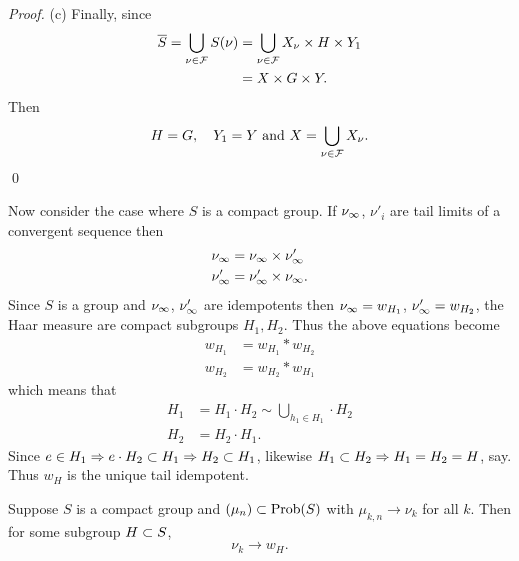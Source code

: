 \begin{proof}
     (c) Finally, since
\[
\begin{aligned}
       \overline S = \bigcup_{\nu\in\mathcal{F}} S(\nu)
          &= \bigcup_{\nu\in\mathcal{F}} X_\nu \times H \times Y_1  \\
     &= X \times G \times Y.
\end{aligned}
\]
Then
\[
     H = G, \quad Y_1 = Y \hbox{ and } X = \bigcup_{\nu\in\mathcal{F}} X_\nu.
\]
\qed
\end{proof}

Now consider the case where $S$ is a compact group.  If $\nu_\infty$,
$\nu'_i$ are tail limits of a convergent sequence then
%
\begin{equation}    \label{eq:3.1}
  \aligned
       \nu_\i &= \nu_\i \times \nu'_\i                 \\
       \nu'_\i &= \nu'_\i \times \nu_\i.
     \endaligned 
\end{equation}
%
Since $S$ is a group and $\nu_\infty$, $\nu'_\infty$ are idempotents then
$\nu_\infty = w_{H_1}$, $\nu'_\infty = w_{H_2}$, the Haar measure are compact
subgroups $H_1, H_2$.  Thus the above equations become
%
\begin{equation}    \label{eq:3.2}
\begin{aligned}
       w_{H_1} &= w_{H_1} * w_{H_2}                \\
       w_{H_2} &= w_{H_2} * w_{H_1}
\end{aligned}
\end{equation}
%
which means that
\[
\begin{aligned}
       H_1 &= H_1 \cdot H_2 \sim \bigcup_{h_1 \in H_1} \cdot H_2 \\
       H_2 &= H_2 \cdot H_1.
\end{aligned}
\]
Since $e \in H_1 \Rightarrow e \cdot H_2 \subset H_1 \Rightarrow H_2 \subset H_1$, likewise $H_1 \subset H_2 \Rightarrow H_1 = H_2 = H$, say.  
Thus $w_H$ is the unique tail idempotent.

\begin{theorem}  	\label{thm:3.4}
Suppose $S$ is a compact group and $(\mu_n) \subset \hbox{Prob}(S)$ with $\mu_{k,n} \to \nu_k$ for all $k$.  
Then for some subgroup $H \subset S$,
\[
     \nu_k \to w_H.
\]
\end{theorem}

